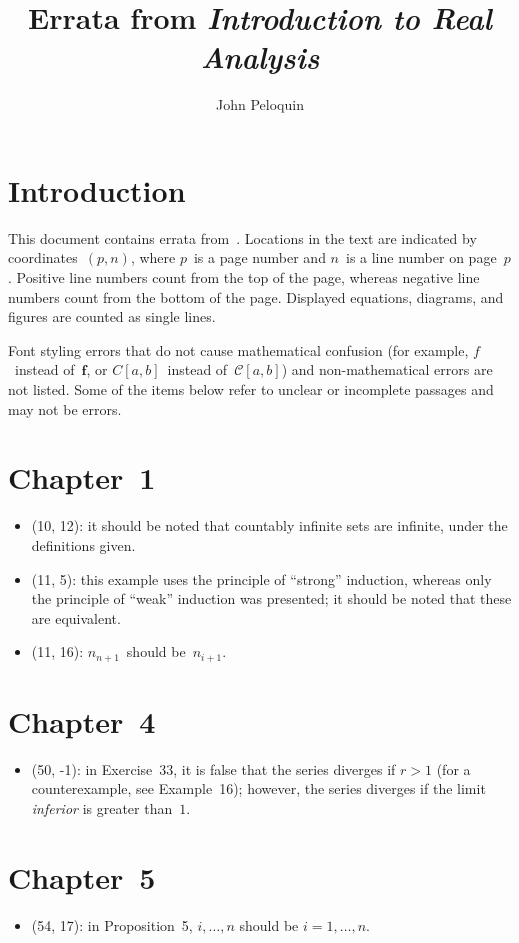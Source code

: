 \documentclass[letterpaper,12pt]{article}
\title{Errata from \textit{Introduction to Real Analysis}}
\author{John Peloquin}
\date{}
\newcommand{\C}{\mathcal{C}}
\renewcommand{\vec}[1]{\boldsymbol{#1}}
\begin{document}
\maketitle
\section*{Introduction}
This document contains errata from~\cite{depree}. Locations in the text are indicated by coordinates~\((p,n)\), where \(p\)~is a page number and \(n\)~is a line number on page~\(p\). Positive line numbers count from the top of the page, whereas negative line numbers count from the bottom of the page. Displayed equations, diagrams, and figures are counted as single lines.

Font styling errors that do not cause mathematical confusion (for example, \(f\)~instead of~\(\vec{f}\), or \(C[a,b]\)~instead of~\(\C[a,b]\)) and non-mathematical errors are not listed. Some of the items below refer to unclear or incomplete passages and may not be errors.

\section*{Chapter~1}
\begin{itemize}
\item (10, 12): it should be noted that countably infinite sets are infinite, under the definitions given.
\item (11, 5): this example uses the principle of ``strong'' induction, whereas only the principle of ``weak'' induction was presented; it should be noted that these are equivalent.
\item (11, 16): \(n_{n+1}\)~should be~\(n_{i+1}\).
\end{itemize}

\section*{Chapter~4}
\begin{itemize}
\item (50, -1): in Exercise~33, it is false that the series diverges if \(r>1\) (for a counterexample, see Example~16); however, the series diverges if the limit \emph{inferior} is greater than~\(1\).
\end{itemize}

\section*{Chapter~5}
\begin{itemize}
\item (54, 17): in Proposition~5, \(i,\ldots,n\) should be \(i=1,\ldots,n\).
\end{itemize}
\end{document}
